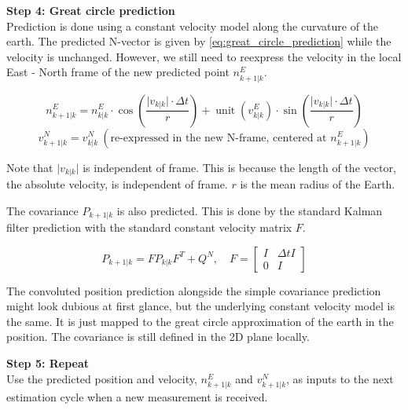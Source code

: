 \textbf{Step 4: Great circle prediction} \\
Prediction is done using a constant velocity model along the curvature of the earth. The predicted N-vector is given by \autoref{eq:great_circle_prediction} while the velocity is unchanged. However, we still need to reexpress the velocity in the local East - North frame of the new predicted point $n^E_{k+1 \vert k}$.

\begin{equation}
    n^{E}_{k+1|k} = n^{E}_{k|k} \cdot \cos \left( \frac{\lvert v_{k|k}\rvert \cdot \Delta t}{r} \right)
 +
\operatorname{unit}\!\left(v^{E}_{k|k}\right) \cdot \sin\left( \frac{\lvert v_{k|k}\rvert \cdot \Delta t}{r} \right)
\label{eq:great_circle_prediction}
\end{equation}
\begin{equation*}
    v^N_{k+1 \vert k} = v^N_{k \vert k} \: (\text{re-expressed in the new N-frame, centered at } n^E_{k+1 \vert k})
\end{equation*}

Note that $\lvert v_{k|k}\rvert$ is independent of frame. This is because the length of the vector, the absolute velocity, is independent of frame. $r$ is the mean radius of the Earth.
\medskip

The covariance $P_{k+1 \vert k}$ is also predicted. This is done by the standard Kalman filter prediction with the standard constant velocity matrix $F$.

\begin{equation}
    P_{k+1 \vert k} = F P_{k \vert k} F^T + Q^N , \quad 
    F = \begin{bmatrix}
        I & \Delta t I \\
        0 & I 
    \end{bmatrix}
\end{equation}

The convoluted position prediction alongside the simple covariance prediction might look dubious at first glance, but the underlying constant velocity model is the same. It is just mapped to the great circle approximation of the earth in the position. The covariance is still defined in the 2D plane locally.

\textbf{Step 5: Repeat} \\
Use the predicted position and velocity, $n^{E}_{k+1|k}$ and $v^N_{k+1 \vert k}$, as inputs to the next estimation cycle when a new measurement is received.
